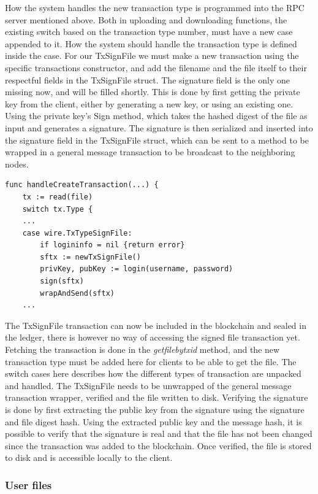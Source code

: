 \documentclass[12pt]{article}
\begin{document}
How the system handles the new transaction type is programmed into the RPC server mentioned above. Both in uploading and downloading functions, the existing switch based on the transaction type number, must have a new case appended to it. How the system should handle the transaction type is defined inside the case. For our TxSignFile we must make a new transaction using the specific transactions constructor, and add the filename and the file itself to their respectful fields in the TxSignFile struct. The signature field is the only one missing now, and will be filled shortly. This is done by first getting the private key from the client, either by generating a new key, or using an existing one. Using the private key's Sign method, which takes the hashed digest of the file as input and generates a signature. The signature is then serialized and inserted into the signature field in the TxSignFile struct, which can be sent to a method to be wrapped in a general message transaction to be broadcast to the neighboring nodes. 
\begin{lstlisting}[float=h!,caption={Pseudo code of the signed file case in createtransaction},label=lst:crtx]
func handleCreateTransaction(...) {
	tx := read(file)
	switch tx.Type {
	...
	case wire.TxTypeSignFile:
		if logininfo = nil {return error}
		sftx := newTxSignFile()
		privKey, pubKey := login(username, password)
		sign(sftx)
		wrapAndSend(sftx)
	...

\end{lstlisting}
The TxSignFile transaction can now be included in the blockchain and sealed in the ledger, there is however no way of accessing the signed file transaction yet. Fetching the transaction is done in the \textit{getfilebytxid} method, and the new transaction type must be added here for clients to be able to get the file. The switch cases here describes how the different types of transaction are unpacked and handled. The TxSignFile needs to be unwrapped of the general message transaction wrapper, verified and the file written to disk. Verifying the signature is done by first extracting the public key from the signature using the signature and file digest hash. Using the extracted public key and the message hash, it is possible to verify that the signature is real and that the file has not been changed since the transaction was added to the blockchain. Once verified, the file is stored to disk and is accessible locally to the client. 

\subsubsection{User files}\label{subsubsec:userfiles}
\end{document}
